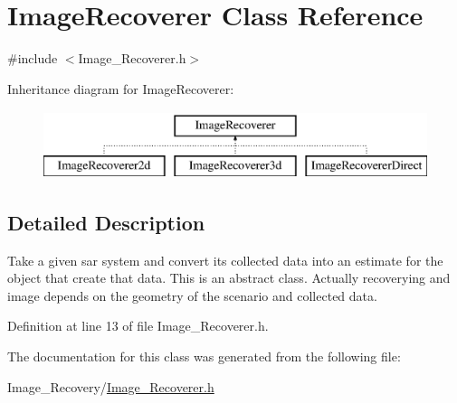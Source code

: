 \hypertarget{class_image_recoverer}{}\section{Image\+Recoverer Class Reference}
\label{class_image_recoverer}


{\ttfamily \#include $<$Image\+\_\+\+Recoverer.\+h$>$}

Inheritance diagram for Image\+Recoverer\+:\begin{figure}[H]
\begin{center}
\leavevmode
\includegraphics[height=2.000000cm]{class_image_recoverer}
\end{center}
\end{figure}


\subsection{Detailed Description}
Take a given sar system and convert its collected data into an estimate for the object that create that data. This is an abstract class. Actually recoverying and image depends on the geometry of the scenario and collected data. 

Definition at line 13 of file Image\+\_\+\+Recoverer.\+h.



The documentation for this class was generated from the following file\+:\begin{DoxyCompactItemize}
\item 
Image\+\_\+\+Recovery/\hyperlink{_image___recoverer_8h}{Image\+\_\+\+Recoverer.\+h}\end{DoxyCompactItemize}
